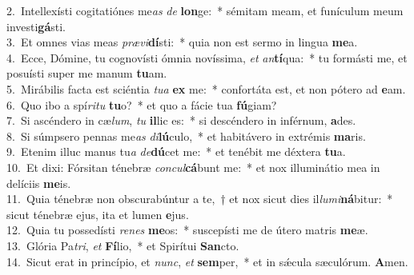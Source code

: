{2.~}Intellexísti cogitatiónes me\textit{as} \textit{de} \textbf{lon}ge:~* sémitam meam, et funículum meum investi\textbf{gá}sti.\\
{3.~}Et omnes vias meas \textit{præ}\textit{vi}\textbf{dí}sti:~* quia non est sermo in lingua \textbf{me}a.\\
{4.~}Ecce, Dómine, tu cognovísti ómnia novíssima, \textit{et} \textit{an}\textbf{tí}qua:~* tu formásti me, et posuísti super me manum \textbf{tu}am.\\
{5.~}Mirábilis facta est sciéntia \textit{tu}\textit{a} \textbf{ex} me:~* confortáta est, et non pótero ad \textbf{e}am.\\
{6.~}Quo ibo a spí\textit{ri}\textit{tu} \textbf{tu}o?~* et quo a fácie tua \textbf{fú}giam?\\
{7.~}Si ascéndero in cæ\textit{lum}, \textit{tu} \textbf{il}lic es:~* si descéndero in inférnum, \textbf{a}des.\\
{8.~}Si súmpsero pennas me\textit{as} \textit{di}\textbf{lú}culo,~* et habitávero in extrémis \textbf{ma}ris.\\
{9.~}Etenim illuc manus tu\textit{a} \textit{de}\textbf{dú}cet me:~* et tenébit me déxtera \textbf{tu}a.\\
{10.~}Et dixi: Fórsitan ténebræ \textit{con}\textit{cul}\textbf{cá}bunt me:~* et nox illuminátio mea in delíciis \textbf{me}is.\\
{11.~}Quia ténebræ non obscurabúntur a te,~† et nox sicut dies il\textit{lu}\textit{mi}\textbf{ná}bitur:~* sicut ténebræ ejus, ita et lumen \textbf{e}jus.\\
{12.~}Quia tu possedísti \textit{re}\textit{nes} \textbf{me}os:~* suscepísti me de útero matris \textbf{me}æ.\\
{13.~}Glória Pa\textit{tri}, \textit{et} \textbf{Fí}lio,~* et Spirítui \textbf{San}cto.\\
{14.~}Sicut erat in princípio, et \textit{nunc}, \textit{et} \textbf{sem}per,~* et in sǽcula sæculórum. \textbf{A}men.\\
